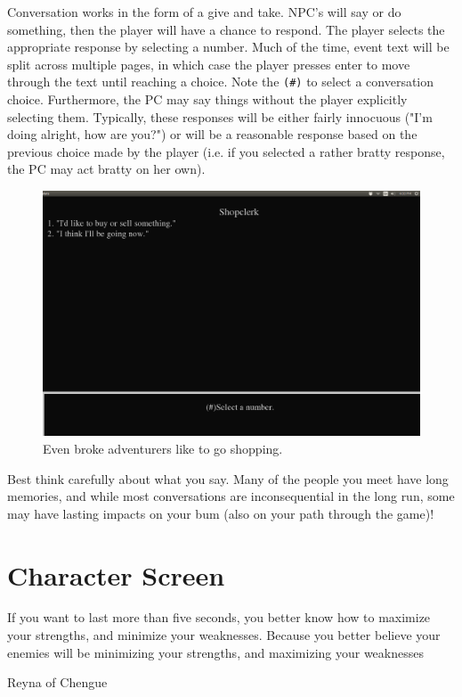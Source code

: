 \documentclass{report}
\begin{document}
    Conversation works in the form of a give and take. NPC's will say or do something, then the player will have a chance to respond. The player selects the appropriate
    response by selecting a number. Much of the time, event text will be split across multiple pages, in which case the player presses enter to move through the text 
    until reaching a choice. Note the \verb|(#)| to select a conversation choice. Furthermore, the PC may say things without the player explicitly selecting them.
    Typically, these responses will be either fairly innocuous ("I'm doing alright, how are you?") or will be a reasonable response based on the previous choice made by the
    player (i.e. if you selected a rather bratty response, the PC may act bratty on her own). 

   \begin{figure}[h!]
        \includegraphics[width=\textwidth]{talking}
        \caption{Even broke adventurers like to go shopping.}
        \label{fig_shopping}
    \end{figure}
    
    Best think carefully about what you say.
    Many of the people you meet have long memories, and while most conversations are inconsequential in the long run, some may have lasting impacts on your bum (also 
    on your path through the game)!

\chapter{Character Screen}
\label{ch_chararacter_screen}
\epigraph{If you want to last
more than five seconds, you better know how to maximize your strengths, and 
minimize your weaknesses. Because you better believe your enemies will be 
minimizing your strengths, and maximizing your weaknesses}{Reyna of Chengue}
\end{document}

